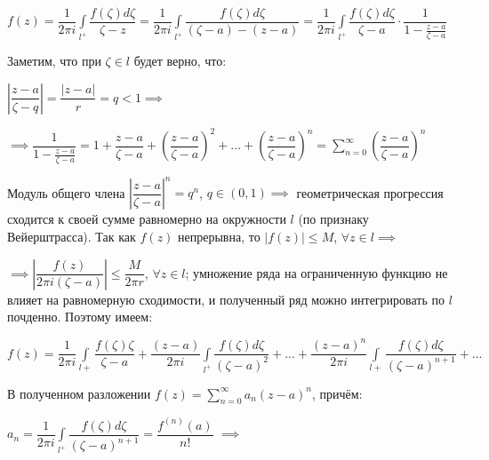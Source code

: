 \documentclass[a4paper, 12pt]{article}
\begin{document}
  \begin{center}
    $f(z) = \dfrac{1}{2\pi i} \displaystyle\int\limits_{l^+} \dfrac{f(\zeta) d\zeta}{\zeta - z} = \dfrac{1}{2 \pi i} \displaystyle\int\limits_{l^+} \dfrac{f(\zeta) d\zeta}{(\zeta - a) - (z- a)} = \dfrac{1}{2\pi i} \displaystyle\int\limits_{l^+} \dfrac{f(\zeta) d\zeta}{\zeta - a} \cdot \dfrac{1}{1 - \frac{z-a}{\zeta - a}}$
  \end{center}

  \quad Заметим, что при $\zeta \in l$ будет верно, что:

  \begin{center}
    $\left| \dfrac{z-a}{\zeta - q} \right| = \dfrac{|z - a|}{r} = q < 1 \implies $

    $ \implies \dfrac{1}{1 - \frac{z -a }{\zeta - a}} = 1 + \dfrac{z - a}{\zeta - a} + \left( \dfrac{z - a }{\zeta -a}\right)^2 + ... + \left( \dfrac{z - a}{\zeta -a} \right)^n = \displaystyle\sum\limits_{n=0}^{\infty} \left( \dfrac{z-a}{\zeta -a} \right)^n $
  \end{center}

  \quad Модуль общего члена $\left| \dfrac{z-a}{\zeta-a} \right|^n = q^n$, $q \in (0, 1) \implies$ геометрическая прогрессия сходится к своей сумме равномерно на окружности $l$ (по признаку Вейерштрасса). Так как $f(z)$ непрерывна, то $|f(z)| \leq M$, $\forall z \in l \implies$

  \quad $\implies \left| \dfrac{f(z)}{2\pi i (\zeta - a)} \right| \leq \dfrac{M}{2 \pi r}$, $\forall z \in l$; умножение ряда на ограниченную функцию не влияет на равномерную сходимости, и полученный ряд можно интегрировать по $l$ почденно. Поэтому имеем:

  \begin{center}
    $f(z) = \dfrac{1}{2 \pi i} \displaystyle\int\limits_{l+} \dfrac{f(\zeta) \zeta}{\zeta - a} + \dfrac{(z-a)}{2 \pi i}\displaystyle\int\limits_{l^+} \dfrac{f(\zeta) d\zeta}{(\zeta - a)^2} + ... + \dfrac{(z-a)^n}{2 \pi i} \displaystyle\int\limits_{l+} \dfrac{f(\zeta) d\zeta}{(\zeta - a)^{n+1}} + ...$
  \end{center}
  
  \quad В полученном разложении $f(z) = \displaystyle\sum\limits_{n=0}^{\infty} a_n (z-a)^n$, причём:

  \begin{center}
    $a_n = \dfrac{1}{2\pi i}\displaystyle\int\limits_{l^+} \dfrac{f(\zeta) d\zeta}{(\zeta -a)^{n+1}} = \dfrac{f^{(n)}(a)}{n!}$ $\implies$
  \end{center}
\end{document}
